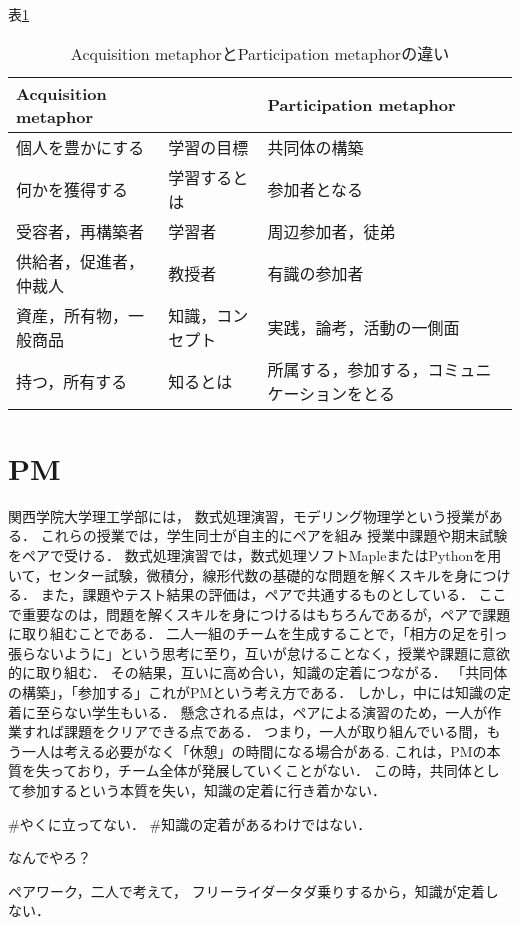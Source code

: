 \documentclass[12pt,a4]{jreport}%
\begin{document}
表\ref{tab:org1ce3c3b}
\begin{table}[htbp]
\caption{\label{tab:org1ce3c3b}
Acquisition metaphorとParticipation metaphorの違い}
\centering
\begin{tabular}{|l|l|l|}
\hline
Acquisition metaphor &  & Participation metaphor\\
\hline
個人を豊かにする & 学習の目標 & 共同体の構築\\
何かを獲得する & 学習するとは & 参加者となる\\
受容者，再構築者 & 学習者 & 周辺参加者，徒弟\\
供給者，促進者，仲裁人 & 教授者 & 有識の参加者\\
資産，所有物，一般商品 & 知識，コンセプト & 実践，論考，活動の一側面\\
持つ，所有する & 知るとは & 所属する，参加する，コミュニケーションをとる\\
\hline
\end{tabular}
\end{table}

\chapter{PM}
\label{sec:org6f32b3c}
関西学院大学理工学部には，
数式処理演習，モデリング物理学という授業がある．
これらの授業では，学生同士が自主的にペアを組み
授業中課題や期末試験をペアで受ける．
数式処理演習では，数式処理ソフトMapleまたはPythonを用いて，センター試験，微積分，線形代数の基礎的な問題を解くスキルを身につける．
また，課題やテスト結果の評価は，ペアで共通するものとしている．
ここで重要なのは，問題を解くスキルを身につけるはもちろんであるが，ペアで課題に取り組むことである．
二人一組のチームを生成することで，「相方の足を引っ張らないように」という思考に至り，互いが怠けることなく，授業や課題に意欲的に取り組む．
その結果，互いに高め合い，知識の定着につながる．
「共同体の構築」，「参加する」これがPMという考え方である．
しかし，中には知識の定着に至らない学生もいる．
懸念される点は，ペアによる演習のため，一人が作業すれば課題をクリアできる点である．
つまり，一人が取り組んでいる間，もう一人は考える必要がなく「休憩」の時間になる場合がある.
これは，PMの本質を失っており，チーム全体が発展していくことがない．
この時，共同体として参加するという本質を失い，知識の定着に行き着かない．


\#やくに立ってない．
\#知識の定着があるわけではない．

なんでやろ？

ペアワーク，二人で考えて，
フリーライダータダ乗りするから，知識が定着しない．
\end{document}
